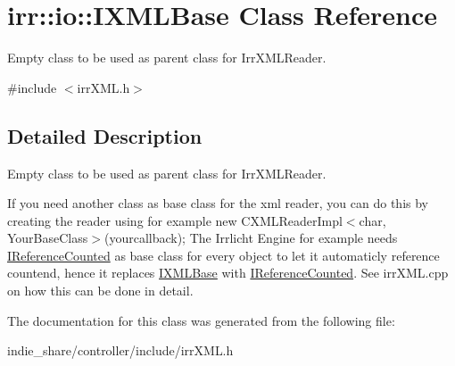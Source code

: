 \hypertarget{classirr_1_1io_1_1IXMLBase}{}\section{irr\+:\+:io\+:\+:I\+X\+M\+L\+Base Class Reference}
\label{classirr_1_1io_1_1IXMLBase}


Empty class to be used as parent class for Irr\+X\+M\+L\+Reader.  




{\ttfamily \#include $<$irr\+X\+M\+L.\+h$>$}



\subsection{Detailed Description}
Empty class to be used as parent class for Irr\+X\+M\+L\+Reader. 

If you need another class as base class for the xml reader, you can do this by creating the reader using for example new C\+X\+M\+L\+Reader\+Impl$<$char, Your\+Base\+Class$>$(yourcallback); The Irrlicht Engine for example needs \hyperlink{classirr_1_1IReferenceCounted}{I\+Reference\+Counted} as base class for every object to let it automaticly reference countend, hence it replaces \hyperlink{classirr_1_1io_1_1IXMLBase}{I\+X\+M\+L\+Base} with \hyperlink{classirr_1_1IReferenceCounted}{I\+Reference\+Counted}. See irr\+X\+M\+L.\+cpp on how this can be done in detail. 

The documentation for this class was generated from the following file\+:\begin{DoxyCompactItemize}
\item 
indie\+\_\+share/controller/include/irr\+X\+M\+L.\+h\end{DoxyCompactItemize}
